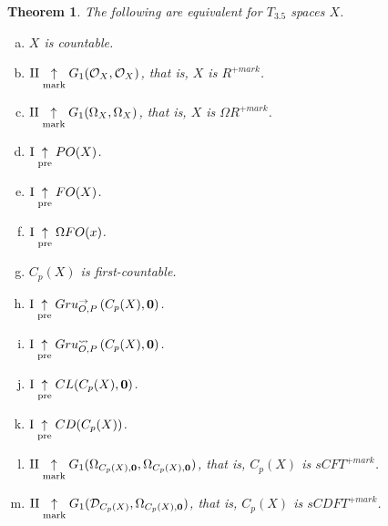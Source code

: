 \documentclass{amsart}
\theoremstyle{plain}
\newtheorem{theorem}{Theorem}
\theoremstyle{definition}
\theoremstyle{remark}
\theoremstyle{plain}
\theoremstyle{definition}
\theoremstyle{remark}
\begin{document}
\begin{theorem}
The following are equivalent for \(T_{3.5}\) spaces \(X\).
 \begin{enumerate}[a)]
  \item \(X\) is countable.
  \item \(\mathrm{II}\underset{\text{mark}}{\uparrow} G_{1}(\mathcal{O}_X,\mathcal{O}_X)\), that is, \(X\) is \(R^{+mark}\).
  \item \(\mathrm{II}\underset{\text{mark}}{\uparrow} G_{1}(\Omega_X,\Omega_X)\), that is, \(X\) is \(\Omega R^{+mark}\).
  \item \(\mathrm{I}\underset{\text{pre}}{\uparrow} PO(X)\). 
  \item \(\mathrm{I}\underset{\text{pre}}{\uparrow} FO(X)\).
  \item \(\mathrm{I}\underset{\text{pre}}{\uparrow}\Omega FO(x)\).
  \item \(C_p(X)\) is first-countable.
  \item \(\mathrm{I}\underset{\text{pre}}{\uparrow} Gru_{O,P}^{\to}\left({C_p(X)},{\mathbf 0}\right)\).
  \item \(\mathrm{I}\underset{\text{pre}}{\uparrow} Gru_{O,P}^{\leadsto}\left({C_p(X)},{\mathbf 0}\right)\).
  \item \(\mathrm{I}\underset{\text{pre}}{\uparrow} CL(C_p(X),\mathbf 0)\).
  \item \(\mathrm{I}\underset{\text{pre}}{\uparrow} CD(C_p(X))\).
  \item \(\mathrm{II}\underset{\text{mark}}{\uparrow} G_{1}(\Omega_{C_p(X),\mathbf 0},\Omega_{C_p(X),\mathbf 0})\),
        that is, \(C_p(X)\) is \(sCFT^{+mark}\).
  \item \(\mathrm{II}\underset{\text{mark}}{\uparrow} G_{1}(\mathcal{D}_{C_p(X)},\Omega_{C_p(X),\mathbf 0})\),
        that is, \(C_p(X)\) is \(sCDFT^{+mark}\).
 \end{enumerate}
\end{theorem}
\end{document}
